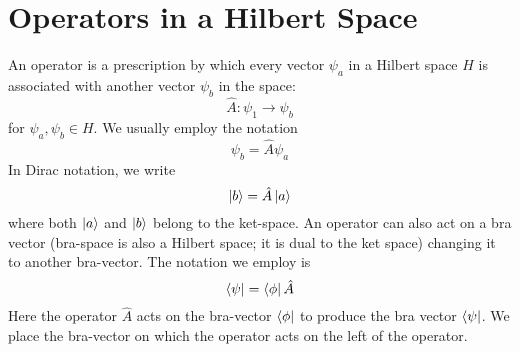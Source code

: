 


\section{Operators in a Hilbert Space}
An operator is a prescription by which every vector $\psi_a$ in a Hilbert space $H$ is associated with another vector $\psi_b$ in the space:
\begin{equation}\label{eqn3.1}
\hat{A} : \psi_1 \rightarrow \psi_b
\end{equation}
for $\psi_a , \psi_b \in H$. We usually employ the notation
\begin{equation}\label{eqn3.2}
\psi_b = \hat{A}\psi_a
\end{equation}
In Dirac notation, we write
\begin{equation}\label{eqn3.3}
\ket{b} = \hat{A}\ket{a}
\end{equation}
where both $\ket{a}$ and $\ket{b}$ belong to the ket-space. An operator can also act on a bra vector (bra-space is also a Hilbert space; it is dual to the ket space) changing it to another bra-vector. The notation we employ is
\begin{equation}\label{eqn3.4}
\bra{\psi} = \bra{\phi} \hat{A}
\end{equation}
Here the operator $\hat{A}$ acts on the bra-vector $\bra{\phi}$ to produce the bra vector $\bra{\psi}$. We place the bra-vector on which the operator acts on the left of the operator.

